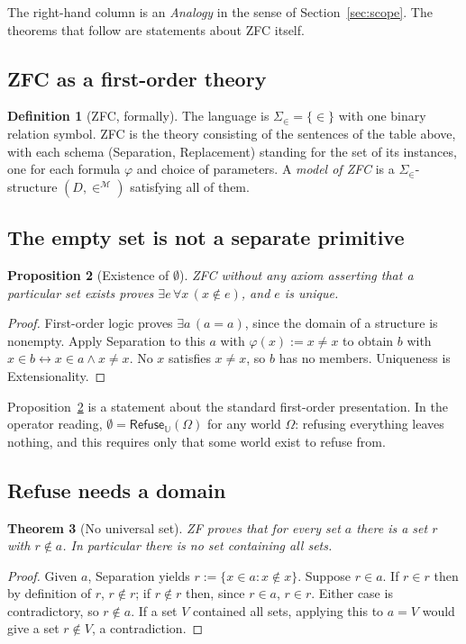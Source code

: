 \documentclass[11pt]{article}
\newcommand{\Refuse}{\mathsf{Refuse}}
\newcommand{\U}{\mathbb{U}}
\newcommand{\Om}{\Omega}
\theoremstyle{definition}
\newtheorem{definition}{Definition}[section]
\theoremstyle{plain}
\newtheorem{theorem}[definition]{Theorem}
\newtheorem{proposition}[definition]{Proposition}
\theoremstyle{remark}
\begin{document}
The right-hand column is an \emph{Analogy} in the sense of Section~\ref{sec:scope}. The theorems that follow are statements about ZFC itself.

\subsection{ZFC as a first-order theory}\label{sec:zfcformal}

\begin{definition}[ZFC, formally]\label{def:zfcformal}
The language is $\Sigma_{\in}=\{\in\}$ with one binary relation symbol. ZFC is the theory consisting of the sentences of the table above, with each schema (Separation, Replacement) standing for the set of its instances, one for each formula $\varphi$ and choice of parameters. A \emph{model of ZFC} is a $\Sigma_{\in}$-structure $(D,\in^{\mathcal M})$ satisfying all of them.
\end{definition}

\subsection{The empty set is not a separate primitive}

\begin{proposition}[Existence of $\emptyset$]\label{prop:empty}
ZFC without any axiom asserting that a particular set exists proves $\exists e\,\forall x\,(x\notin e)$, and $e$ is unique.
\end{proposition}
\begin{proof}
First-order logic proves $\exists a\,(a=a)$, since the domain of a structure is nonempty. Apply Separation to this $a$ with $\varphi(x):=x\neq x$ to obtain $b$ with $x\in b\leftrightarrow x\in a\wedge x\neq x$. No $x$ satisfies $x\neq x$, so $b$ has no members. Uniqueness is Extensionality.
\end{proof}

Proposition~\ref{prop:empty} is a statement about the standard first-order presentation. In the operator reading, $\emptyset=\Refuse_{\U}(\Om)$ for any world $\Om$: refusing everything leaves nothing, and this requires only that some world exist to refuse from.

\subsection{Refuse needs a domain}

\begin{theorem}[No universal set]\label{thm:russell}
ZF proves that for every set $a$ there is a set $r$ with $r\notin a$. In particular there is no set containing all sets.
\end{theorem}
\begin{proof}
Given $a$, Separation yields $r:=\{x\in a: x\notin x\}$. Suppose $r\in a$. If $r\in r$ then by definition of $r$, $r\notin r$; if $r\notin r$ then, since $r\in a$, $r\in r$. Either case is contradictory, so $r\notin a$. If a set $V$ contained all sets, applying this to $a=V$ would give a set $r\notin V$, a contradiction.
\end{proof}
\end{document}
